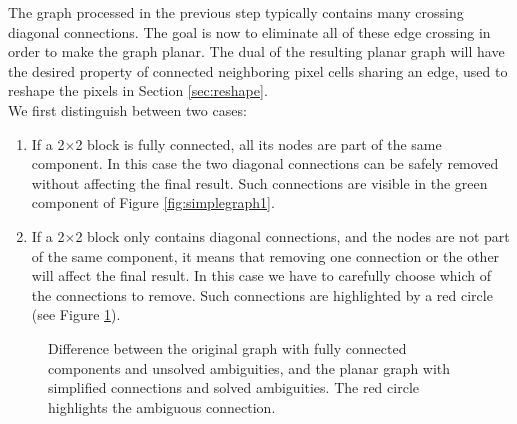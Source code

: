 \documentclass[]{usiinfbachelorproject}
\begin{document}
The graph processed in the previous step typically contains many crossing diagonal connections. The goal is now to eliminate all of these edge crossing in order to make the graph planar. The dual of the resulting planar graph will have the desired property of connected neighboring pixel cells sharing an edge, used to reshape the pixels in Section \ref{sec:reshape}.\\
We first distinguish between two cases:
\begin{enumerate}
	\item If a 2$\times$2 block is fully connected, all its nodes are part of the same component. In this case the two diagonal connections can be safely removed without affecting the final result. Such connections are visible in the green component of Figure \ref{fig:simplegraph1}.
	\item If a 2$\times$2 block only contains diagonal connections, and the nodes are not part of the same component, it means that removing one connection or the other will affect the final result. In this case we have to carefully choose which of the connections to remove. Such connections are highlighted by a red circle (see Figure \ref{fig:simplegraph}).
\end{enumerate}

\begin{figure}[ht]
		\centering
		\caption{Difference between the original graph  with fully connected components and unsolved ambiguities, and the planar graph  with simplified connections and solved ambiguities. The red circle highlights the ambiguous connection.}
		\label{fig:simplegraph}
	\end{figure}
	
\end{document}
